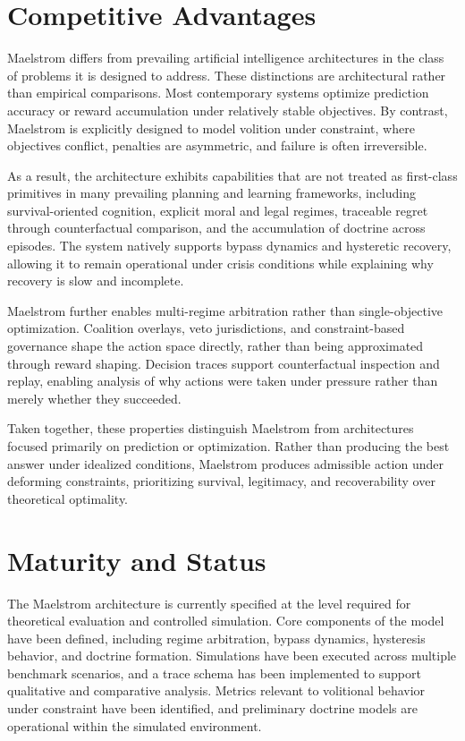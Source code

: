 \documentclass[11pt,a4paper]{article}
\begin{document}
\section{Competitive Advantages}

Maelstrom differs from prevailing artificial intelligence architectures in the class of problems it is designed to address. These distinctions are architectural rather than empirical comparisons. Most contemporary systems optimize prediction accuracy or reward accumulation under relatively stable objectives. By contrast, Maelstrom is explicitly designed to model volition under constraint, where objectives conflict, penalties are asymmetric, and failure is often irreversible.

As a result, the architecture exhibits capabilities that are not treated as first-class primitives in many prevailing planning and learning frameworks, including survival-oriented cognition, explicit moral and legal regimes, traceable regret through counterfactual comparison, and the accumulation of doctrine across episodes. The system natively supports bypass dynamics and hysteretic recovery, allowing it to remain operational under crisis conditions while explaining why recovery is slow and incomplete.

Maelstrom further enables multi-regime arbitration rather than single-objective optimization. Coalition overlays, veto jurisdictions, and constraint-based governance shape the action space directly, rather than being approximated through reward shaping. Decision traces support counterfactual inspection and replay, enabling analysis of why actions were taken under pressure rather than merely whether they succeeded.

Taken together, these properties distinguish Maelstrom from architectures focused primarily on prediction or optimization. Rather than producing the best answer under idealized conditions, Maelstrom produces admissible action under deforming constraints, prioritizing survival, legitimacy, and recoverability over theoretical optimality.

\section{Maturity and Status}

The Maelstrom architecture is currently specified at the level required for theoretical evaluation and controlled simulation. Core components of the model have been defined, including regime arbitration, bypass dynamics, hysteresis behavior, and doctrine formation. Simulations have been executed across multiple benchmark scenarios, and a trace schema has been implemented to support qualitative and comparative analysis. Metrics relevant to volitional behavior under constraint have been identified, and preliminary doctrine models are operational within the simulated environment.
\end{document}
